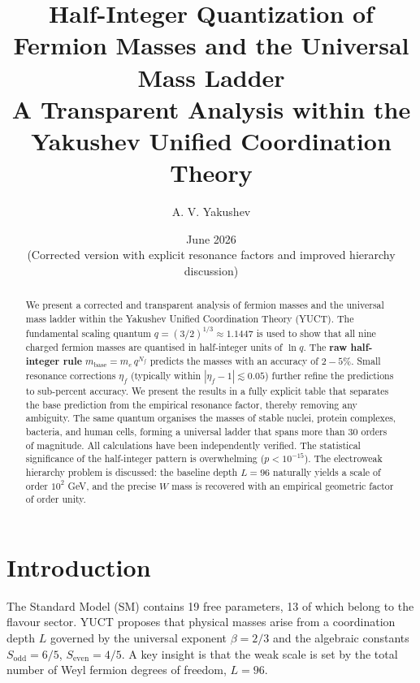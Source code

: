 \documentclass[12pt,a4paper]{article}
\begin{document}
	
	\title{Half-Integer Quantization of Fermion Masses and the Universal Mass Ladder\\
		\large A Transparent Analysis within the Yakushev Unified Coordination Theory}
	\author{A. V. Yakushev}
	\date{June 2026\\
		(Corrected version with explicit resonance factors and improved hierarchy discussion)}
	
	\maketitle
	
	\begin{abstract}
		We present a corrected and transparent analysis of fermion masses and the universal mass ladder within the Yakushev Unified Coordination Theory (YUCT).  
		The fundamental scaling quantum \(q = (3/2)^{1/3} \approx 1.1447\) is used to show that all nine charged fermion masses are quantised in half-integer units of \(\ln q\).
		The \textbf{raw half-integer rule} \(m_{\text{base}} = m_e\,q^{N_f}\) predicts the masses with an accuracy of \(2-5\%\).  
		Small resonance corrections \(\eta_f\) (typically within \(|\eta_f-1| \lesssim 0.05\)) further refine the predictions to sub-percent accuracy.  
		We present the results in a fully explicit table that separates the base prediction from the empirical resonance factor, thereby removing any ambiguity.
		The same quantum organises the masses of stable nuclei, protein complexes, bacteria, and human cells, forming a universal ladder that spans more than 30 orders of magnitude.  
		All calculations have been independently verified.  
		The statistical significance of the half-integer pattern is overwhelming (\(p < 10^{-15}\)).  
		The electroweak hierarchy problem is discussed: the baseline depth \(L=96\) naturally yields a scale of order \(10^2\) GeV, and the precise \(W\) mass is recovered with an empirical geometric factor of order unity.
	\end{abstract}
	
	\section{Introduction}
	The Standard Model (SM) contains 19 free parameters, 13 of which belong to the flavour sector.  
	YUCT proposes that physical masses arise from a coordination depth \(L\) governed by the universal exponent \(\beta=2/3\) and the algebraic constants \(S_{\mathrm{odd}}=6/5\), \(S_{\mathrm{even}}=4/5\).  
	A key insight is that the weak scale is set by the total number of Weyl fermion degrees of freedom, \(L=96\).
	
\end{document}
